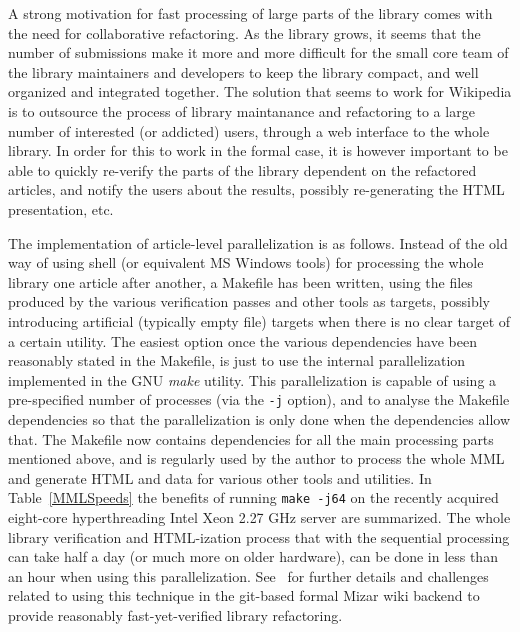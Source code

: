 \documentclass{llncs}
\begin{document}
A strong motivation for fast processing of large parts of the library
comes with the need for collaborative refactoring.  As the library
grows, it seems that the number of submissions make it more and more
difficult for the small core team of the library maintainers and
developers to keep the library compact, and well organized and
integrated together. The solution that seems to work for Wikipedia is
to outsource the process of library maintanance and refactoring to a
large number of interested (or addicted) users, through a web
interface to the whole library. In order for this to work in the
formal case, it is however important to be able to quickly re-verify
the parts of the library dependent on the refactored articles, and
notify the users about the results, possibly re-generating the HTML
presentation, etc.

The implementation of article-level parallelization is as
follows. Instead of the old way of using shell (or equivalent MS
Windows tools) for processing the whole library one article after
another, a Makefile has been written, using the files produced by the
various verification passes and other tools as targets, possibly
introducing artificial (typically empty file) targets when there is no
clear target of a certain utility. The easiest option once the various
dependencies have been reasonably stated in the Makefile, is just to
use the internal parallelization implemented in the GNU \emph{make}
utility. This parallelization is capable of using a pre-specified
number of processes (via the {\tt -j} option), and to analyse the
Makefile dependencies so that the parallelization is only done when
the dependencies allow that. The Makefile now contains dependencies
for all the main processing parts mentioned above, and is regularly
used by the author to process the whole MML and generate HTML and data
for various other tools and utilities. In Table~\ref{MMLSpeeds} the
benefits of running {\tt make -j64} on the recently acquired
eight-core hyperthreading Intel Xeon 2.27 GHz server are
summarized. The whole library verification and HTML-ization process
that with the sequential processing can take half a day (or much more
on older hardware), can be done in less than an hour when using this
parallelization. See~\cite{UrbanARG10} for further details and challenges
related to using this technique in the git-based formal Mizar wiki backend to
provide reasonably fast-yet-verified library refactoring.
\end{document}
